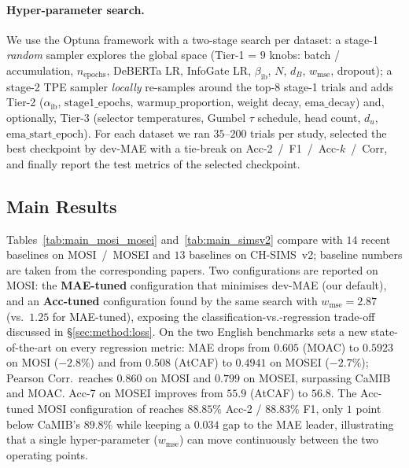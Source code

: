 \paragraph{Hyper-parameter search.}
We use the Optuna framework \citep{akiba2019optuna} with a two-stage
search per dataset: a stage-1 \emph{random} sampler explores the global
space (Tier-1 = $9$ knobs: batch / accumulation, $n_{\text{epochs}}$,
DeBERTa LR, InfoGate LR, $\beta_{\text{ib}}$,
$N$, $d_{B}$, $w_{\text{mse}}$, dropout); a stage-2 TPE sampler
\emph{locally} re-samples around the top-$8$ stage-1 trials and adds
Tier-2 ($\alpha_{\text{ib}}$, $\mathrm{stage1\_epochs}$,
$\mathrm{warmup\_proportion}$, weight decay, $\mathrm{ema\_decay}$) and,
optionally, Tier-3 (selector temperatures, Gumbel $\tau$ schedule, head
count, $d_{u}$, $\mathrm{ema\_start\_epoch}$).
For each dataset we ran $35$--$200$ trials per study, selected the best
checkpoint by dev-MAE with a tie-break on Acc-2~/~F1~/~Acc-$k$~/~Corr,
and finally report the test metrics of the selected checkpoint.

\subsection{Main Results}
\label{sec:exp:results}

Tables~\ref{tab:main_mosi_mosei} and~\ref{tab:main_simsv2} compare
\methodname{} with $14$ recent baselines on MOSI~/~MOSEI and $13$ baselines
on CH-SIMS~v2; baseline numbers are taken from the corresponding
papers.
Two \methodname{} configurations are reported on MOSI: the
\textbf{MAE-tuned} configuration that minimises dev-MAE (our default),
and an \textbf{Acc-tuned} configuration found by the same search with
$w_{\text{mse}}\!=\!2.87$ (vs.\ $1.25$ for MAE-tuned), exposing the
classification-vs.-regression trade-off discussed in
\S\ref{sec:method:loss}.
On the two English benchmarks \methodname{} sets a new state-of-the-art
on every regression metric: MAE drops from $0.605$ (MOAC) to $0.5923$
on MOSI ($-2.8\%$) and from $0.508$ (AtCAF) to $0.4941$ on MOSEI
($-2.7\%$); Pearson Corr.\ reaches $0.860$ on MOSI and $0.799$ on
MOSEI, surpassing CaMIB and MOAC.
Acc-7 on MOSEI improves from $55.9$ (AtCAF) to $56.8$.
The Acc-tuned MOSI configuration of \methodname{} reaches $88.85\%$
Acc-2 / $88.83\%$ F1, only $1$ point below CaMIB's $89.8\%$ while
keeping a $0.034$ gap to the MAE leader, illustrating that a single
hyper-parameter ($w_{\text{mse}}$) can move \methodname{} continuously
between the two operating points.

